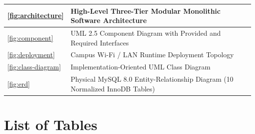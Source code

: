 \documentclass[oneside,final]{hcmut-report}
\begin{document}
{\begin{longtable}[l]{|C{1.5cm}|L{11.85cm}|C{1.32cm}|}
  \hline
  \ref{fig:architecture} & High-Level Three-Tier Modular Monolithic Software Architecture & \pageref{fig:architecture} \\
  \hline
  \ref{fig:component} & UML 2.5 Component Diagram with Provided and Required Interfaces & \pageref{fig:component} \\
  \hline
  \ref{fig:deployment} & Campus Wi-Fi / LAN Runtime Deployment Topology & \pageref{fig:deployment} \\
  \hline
  \ref{fig:class-diagram} & Implementation-Oriented UML Class Diagram & \pageref{fig:class-diagram} \\
  \hline
  \ref{fig:erd} & Physical MySQL 8.0 Entity-Relationship Diagram (10 Normalized InnoDB Tables) & \pageref{fig:erd} \\
  \hline
\end{longtable}
}

\clearpage
\section*{List of Tables}
\end{document}
